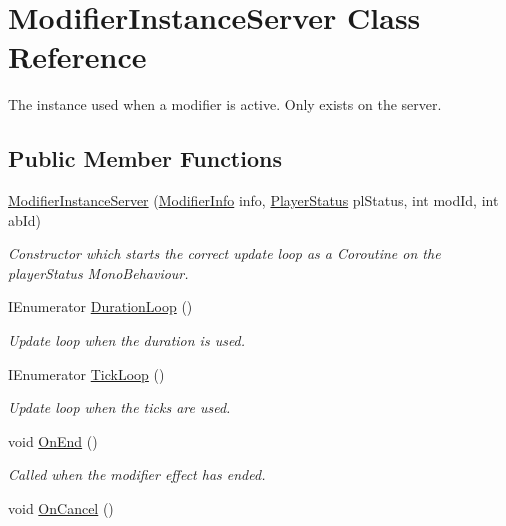 \hypertarget{class_modifier_instance_server}{}\section{Modifier\+Instance\+Server Class Reference}
\label{class_modifier_instance_server}


The instance used when a modifier is active. Only exists on the server.  


\subsection*{Public Member Functions}
\begin{DoxyCompactItemize}
\item 
\hyperlink{class_modifier_instance_server_aac7cc3c3b5356e69334ba23463f80003}{Modifier\+Instance\+Server} (\hyperlink{struct_modifier_info}{Modifier\+Info} info, \hyperlink{class_player_status}{Player\+Status} pl\+Status, int mod\+Id, int ab\+Id)
\begin{DoxyCompactList}\small\item\em Constructor which starts the correct update loop as a Coroutine on the player\+Status Mono\+Behaviour. \end{DoxyCompactList}\item 
I\+Enumerator \hyperlink{class_modifier_instance_server_ab5c89db441a05d7fd43b627696ac1a65}{Duration\+Loop} ()
\begin{DoxyCompactList}\small\item\em Update loop when the duration is used. \end{DoxyCompactList}\item 
I\+Enumerator \hyperlink{class_modifier_instance_server_ab912c1a035383dc7d396701309ea6e6c}{Tick\+Loop} ()
\begin{DoxyCompactList}\small\item\em Update loop when the ticks are used. \end{DoxyCompactList}\item 
void \hyperlink{class_modifier_instance_server_ae96d1f30204b227178e4da20d8b17f84}{On\+End} ()
\begin{DoxyCompactList}\small\item\em Called when the modifier effect has ended. \end{DoxyCompactList}\item 
void \hyperlink{class_modifier_instance_server_a2057c55beeaae1d267f1a331ba89a093}{On\+Cancel} ()

\end{DoxyCompactItemize}
